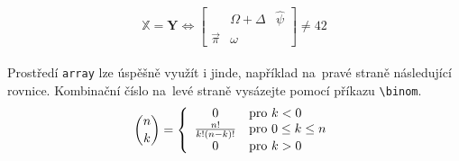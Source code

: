 \documentclass[11pt,a4paper, twocolumn]{article}
\theoremstyle{definition}
\theoremstyle{definition}
\begin{document}
\begin{displaymath}
    \mathbb{X} = \textbf{Y} \Longleftrightarrow 
    \left[ 
    \begin{array}{ccc}
     & \Omega + \Delta & \hat{\psi}\\
    \vec{\pi} & \omega &  
    \end{array} 
    \right]
\neq 42
\end{displaymath} 

\paragraph{} Prostředí \verb|array| lze úspěšně využít i jinde, například na~pravé straně následující rovnice. Kombinační číslo na~levé straně vysázejte pomocí příkazu \verb|\binom|.
\begin{displaymath}
     \binom{n}{k} = \left\{
        \begin{array}{c l}
        0 & \text{pro } k < 0 \\
        \frac{n!}{k!(n-k)!} & \text{pro } 0 \leq k \leq n \\
        0 & \text{pro } k > 0 \
    \end{array} \right.
\end{displaymath}
\end{document}
